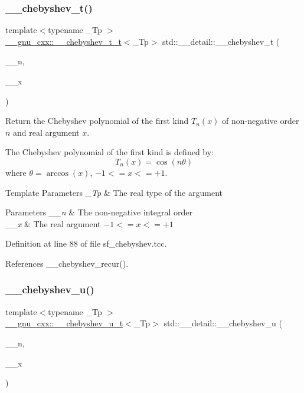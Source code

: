 \subsubsection{\texorpdfstring{\+\_\+\+\_\+chebyshev\+\_\+t()}{\_\_chebyshev\_t()}}
{\footnotesize\ttfamily template$<$typename \+\_\+\+Tp $>$ \\
\hyperlink{struct____gnu__cxx_1_1____chebyshev__t__t}{\+\_\+\+\_\+gnu\+\_\+cxx\+::\+\_\+\+\_\+chebyshev\+\_\+t\+\_\+t}$<$\+\_\+\+Tp$>$ std\+::\+\_\+\+\_\+detail\+::\+\_\+\+\_\+chebyshev\+\_\+t (\begin{DoxyParamCaption}\item[{unsigned int}]{\+\_\+\+\_\+n,  }\item[{\+\_\+\+Tp}]{\+\_\+\+\_\+x }\end{DoxyParamCaption})}

Return the Chebyshev polynomial of the first kind $ T_n(x) $ of non-\/negative order $ n $ and real argument $ x $.

The Chebyshev polynomial of the first kind is defined by\+: \[ T_n(x) = \cos(n \theta) \] where $ \theta = \arccos(x) $, $ -1 <= x <= +1 $.


\begin{DoxyTemplParams}{Template Parameters}
{\em \+\_\+\+Tp} & The real type of the argument \\
\hline
\end{DoxyTemplParams}

\begin{DoxyParams}{Parameters}
{\em \+\_\+\+\_\+n} & The non-\/negative integral order \\
\hline
{\em \+\_\+\+\_\+x} & The real argument $ -1 <= x <= +1 $ \\
\hline
\end{DoxyParams}


Definition at line 88 of file sf\+\_\+chebyshev.\+tcc.



References \+\_\+\+\_\+chebyshev\+\_\+recur().

\mbox{\label{namespacestd_1_1____detail_a0ed32bbc4a1eaf32dc1dc5f423527008}} 
\subsubsection{\texorpdfstring{\+\_\+\+\_\+chebyshev\+\_\+u()}{\_\_chebyshev\_u()}}
{\footnotesize\ttfamily template$<$typename \+\_\+\+Tp $>$ \\
\hyperlink{struct____gnu__cxx_1_1____chebyshev__u__t}{\+\_\+\+\_\+gnu\+\_\+cxx\+::\+\_\+\+\_\+chebyshev\+\_\+u\+\_\+t}$<$\+\_\+\+Tp$>$ std\+::\+\_\+\+\_\+detail\+::\+\_\+\+\_\+chebyshev\+\_\+u (\begin{DoxyParamCaption}\item[{unsigned int}]{\+\_\+\+\_\+n,  }\item[{\+\_\+\+Tp}]{\+\_\+\+\_\+x }\end{DoxyParamCaption})}

